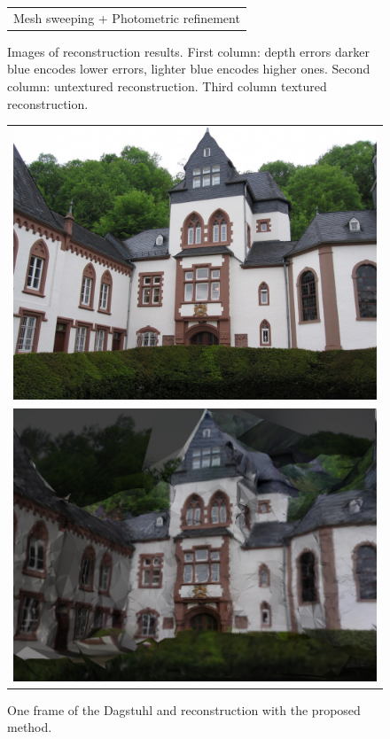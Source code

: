 \begin{figure}[t]
\begin{tabular}{ccc}
\multicolumn{3}{c}{Mesh sweeping + Photometric refinement}\\
\end{tabular}
\caption{Images of reconstruction results. First column: depth errors darker blue encodes lower errors, lighter blue encodes higher ones. Second column: untextured reconstruction. Third column textured reconstruction.}
\label{fig:fountainIm}
\end{figure}



\begin{figure}[t]
\setlength{\tabcolsep}{1px}
\centering
\begin{tabular}{c}
\includegraphics[width=0.8\columnwidth]{./img/dag004}\\
\includegraphics[width=0.8\columnwidth]{./img/d_crop}\\
\end{tabular}
\caption{One frame of the Dagstuhl and reconstruction with the proposed method.}
\label{fig:Dagstuhl}
\end{figure}

